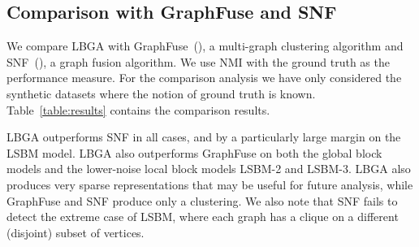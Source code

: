 \documentclass{article}
\begin{document}
\subsection{Comparison with GraphFuse and SNF}
\label{sec:comparison}
We compare LBGA with GraphFuse~(\cite{Papalexakis2013}), a multi-graph clustering
algorithm and SNF~(\cite{Wang14}), a graph fusion algorithm. We use NMI with the
ground truth as the performance measure. For the comparison analysis we have
only considered the synthetic datasets where the notion of ground truth is
known. Table~\ref{table:results} contains the comparison results. 

LBGA outperforms SNF in all cases, and by a particularly large margin on the
LSBM model. LBGA also outperforms GraphFuse on both the global block models and the
lower-noise local block models LSBM-2 and LSBM-3. LBGA also produces very
sparse representations that may be useful for future analysis, while GraphFuse
and SNF produce only a clustering. We also note that SNF fails to detect the
extreme case of LSBM, where each graph has a clique on a different (disjoint)
subset of vertices.
\end{document}
